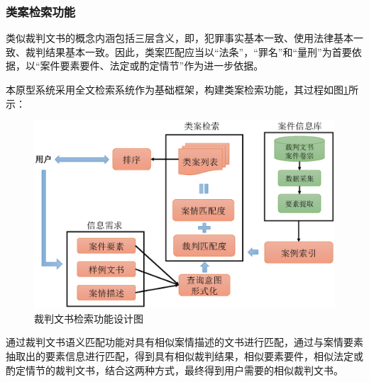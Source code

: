
\subsubsection{类案检索功能}
类似裁判文书的概念内涵包括三层含义，即，犯罪事实基本一致、使用法律基本一致、裁判结果基本一致。因此，类案匹配应当以“法条”，“罪名”和“量刑”为首要依据，以“案件要素要件、法定或酌定情节”作为进一步依据。

本原型系统采用全文检索系统作为基础框架，构建类案检索功能，其过程如图\ref{fig:sys_recomm}所示：
\begin{figure}[htbp]%
    \centering
    \includegraphics[scale=0.48, clip=true]{./sources/sys_recomm.eps}
    \caption{\label{fig:sys_recomm}裁判文书检索功能设计图}
\end{figure}

通过裁判文书语义匹配功能对具有相似案情描述的文书进行匹配，通过与案情要素抽取出的要素信息进行匹配，得到具有相似裁判结果，相似要素要件，相似法定或酌定情节的裁判文书，结合这两种方式，最终得到用户需要的相似裁判文书。

